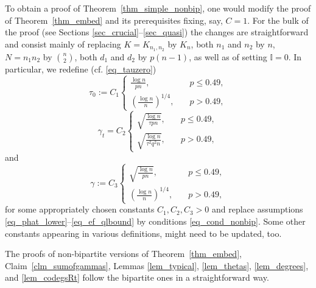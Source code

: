 \documentclass[12pt,reqno]{amsart}
\newcommand{\I} {\mathbb I}
\theoremstyle{definition}
\begin{document}
\medskip

To obtain a proof of Theorem~\ref{thm_simple_nonbip}, one would modify the proof of Theorem~\ref{thm_embed} and its prerequisites fixing, say, $C = 1$. For the bulk of the proof (see Sections \ref{sec_crucial}--\ref{sec_quasi}) the changes are straightforward and consist mainly of replacing $K = K_{n_1, n_2}$ by $K_n$, both $n_1$ and $n_2$ by $n$, $N = n_1 n_2$  by $\binom{n}{2}$, both $d_1$ and $d_2$ by $p(n-1)$, as well as of setting $\I = 0$.
In particular, we redefine  (cf. \eqref{eq_tauzero})
\begin{equation}
  \label{eq_nonbip_tauzero}
	\tau_0 := C_1\begin{cases}
		  \frac{\log n}{p n}, \quad & p \le 0.49, \\
		  \left(\frac{\log n}{n}\right)^{1/4},
		 \quad & p > 0.49,
	\end{cases}
\end{equation}
\begin{equation*}
  \gamma_t = C_2 \begin{cases}
    \sqrt{\frac{\log n}{\tau p n}}, \quad & p \le 0.49, \\
\sqrt{\frac{\log n}{\tau^2 q^2 n}}, \quad & p > 0.49,
  \end{cases}
\end{equation*}
and
\begin{equation*}
	\gamma := C_3
	\begin{cases}
	  \sqrt{\frac{\log n}{p n}}, \quad & p \le 0.49, \\
		  \left(\frac{\log n}{n}\right)^{1/4},
		 \quad & p > 0.49,
	       \end{cases}
\end{equation*}
for some appropriately chosen constants $C_1, C_2, C_3 > 0$ and replace assumptions \eqref{eq_phat_lower}--\eqref{eq_ef_qlbound} by conditions \eqref{eq_cond_nonbip}.
Some other constants appearing in various definitions, might need to be updated, too.

The proofs of non-bipartite versions of Theorem~\ref{thm_embed}, Claim~\ref{clm_sumofgammas}, Lemmas \ref{lem_typical}, \ref{lem_thetas}, \ref{lem_degrees}, and \ref{lem_codegsRt} follow the bipartite ones in a straightforward way.
\end{document}
